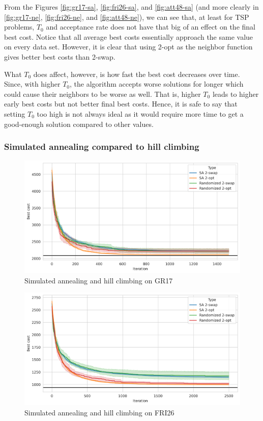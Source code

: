 From the Figures \ref{fig:gr17-sa}, \ref{fig:fri26-sa}, and \ref{fig:att48-sa} (and more clearly in \ref{fig:gr17-ne}, \ref{fig:fri26-ne}, and \ref{fig:att48-ne}), we can see that, at least for TSP problems, \(T_0\) and acceptance rate does not have that big of an effect on the final best cost. Notice that all average best costs essentially approach the same value on every data set. However, it is clear that using 2-opt as the neighbor function gives better best costs than 2-swap.

What \(T_0\) does affect, however, is how fast the best cost decreases over time. Since, with higher \(T_0\), the algorithm accepts worse solutions for longer which could cause their neighbors to be worse as well. That is, higher \(T_0\) leads to higher early best costs but not better final best costs. Hence, it is safe to say that setting \(T_0\) too high is not always ideal as it would require more time to get a good-enough solution compared to other values.

\subsubsection*{Simulated annealing compared to hill climbing}

\begin{figure}
    \centering
    \includegraphics[height=0.27\textheight]{images/gr17-with-hc.png}
    \caption{Simulated annealing and hill climbing on GR17}
    \label{fig:gr17}
\end{figure}

\begin{figure}
    \centering
    \includegraphics[height=0.27\textheight]{images/fri26-with-hc.png}
    \caption{Simulated annealing and hill climbing on FRI26}
    \label{fig:fri26}
\end{figure}

